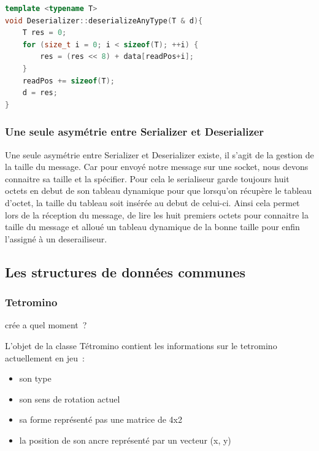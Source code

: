\documentclass[a4paper, 12pt]{article}
\begin{document}
\begin{lstlisting}[language=C++, caption=Méthode de desérailisation de type simple\, data est notre tableau dynamique\, d la varaible de type T à desérailiser et readPos la position de lecture du desérialiseur]
template <typename T>
void Deserializer::deserializeAnyType(T & d){
	T res = 0;
	for (size_t i = 0; i < sizeof(T); ++i) {
		res = (res << 8) + data[readPos+i];
	}
	readPos += sizeof(T);
	d = res;
}\end{lstlisting}

			\subsubsection{Une seule asymétrie entre Serializer et Deserializer}

			Une seule asymétrie entre Serializer et Deserializer existe, il s'agit de la gestion de la taille du message. Car pour envoyé notre message sur une socket, nous devons connaitre sa taille et la spécifier. Pour cela le serialiseur garde toujours huit octets en debut de son tableau dynamique pour que lorsqu'on récupère le tableau d'octet, la taille du tableau soit insérée au debut de celui-ci. Ainsi cela permet lors de la réception du message, de lire les huit premiers octets pour connaitre la taille du message et alloué un tableau dynamique de la bonne taille pour enfin l'assigné à un deserailiseur.

	
	\subsection{Les structures de données communes}

		\subsubsection{Tetromino}

			crée a quel moment ?

			L’objet de la classe Tétromino contient les informations sur le tetromino actuellement en jeu :
			\begin{itemize}
				\item son type
				\item son sens de rotation actuel
				\item sa forme représenté pas une matrice de 4x2
				\item la position de son ancre représenté par un vecteur (x, y)
			\end{itemize}
\end{document}
